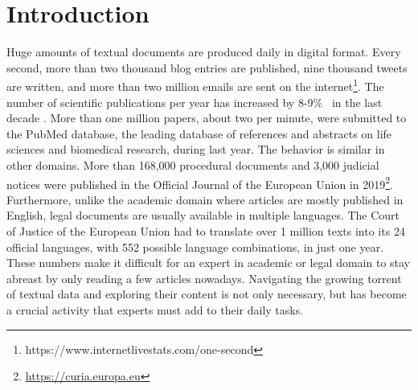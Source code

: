 

\chapter{Introduction}\label{ch:introduction}

\graphicspath{{introduction/figures/}}




Huge amounts of textual documents are produced daily in digital format. Every second, more than two thousand blog entries are published, nine thousand tweets are written, and more than two million emails are sent on the internet\footnote{https://www.internetlivestats.com/one-second}. The number of scientific publications per year has increased by 8-9\%~ in the last decade \citep{Ware2018STM}. More than one million papers, about two per minute,  were submitted to the PubMed database, the leading database of references and abstracts on life sciences and biomedical research, during last year. The behavior is similar in other domains. More than 168,000 procedural documents and 3,000 judicial notices were published in the Official Journal of the European Union in 2019\footnote{\url{https://curia.europa.eu}}. Furthermore, unlike the academic domain where articles are mostly published in English, legal documents are usually available in multiple languages. The Court of Justice of the European Union had to translate over 1 million texts into its 24 official languages, with 552 possible language combinations, in just one year. These numbers make it difficult for an expert in academic or legal domain to stay abreast by only reading a few articles nowadays. Navigating the growing torrent of textual data and exploring their content is not only necessary, but has become a crucial activity that experts must add to their daily tasks. 

